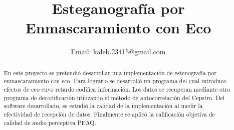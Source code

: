 \documentclass[conference]{IEEEtran}
\begin{document}
%
\title{Esteganografía por Enmascaramiento con Eco}


\author{
Email: kaleb.23415@gmail.com}



% 








\maketitle

\begin{abstract}
En este proyecto se pretendió desarrollar una implementación de estenografía por enmascaramiento con eco. Para lograrlo se desarrolló un programa del cual introduce efectos de eco cuyo retardo codifica información. Los datos se recuperan mediante otro programa de decodificación utilizando el método de autocorrelación del Cepstro. Del software desarrollado, se estudió la calidad de la implementación al medir la efectividad de recepción de datos. Finalmente se aplicó la calificación objetiva de calidad de audio perceptiva PEAQ.
\end{abstract}
\end{document}
